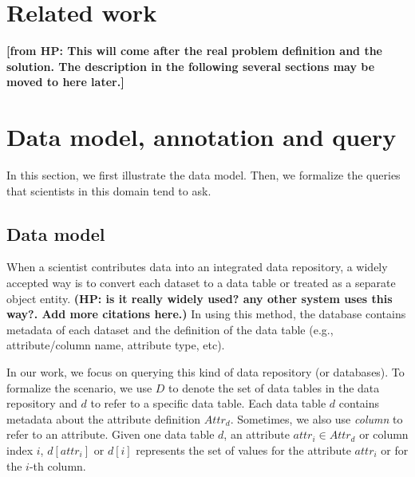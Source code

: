 \documentclass[conference]{IEEEtran}
\newcommand{\from}[2]{{\bf[{\sc from #1:} #2]}}
\begin{document}
\section{Related work}\label{sec:relatedwork}

\from{HP}{This will come after the real problem definition and the
  solution. The description in the following several sections may be
  moved to here later.}

\section{Data model, annotation and query}\label{sec:dataquery}




In this section, we first illustrate the data model. Then, we
formalize the queries that scientists in this domain tend to ask. 

\subsection{Data model}\label{sec:datamodel}

When a scientist contributes data into an integrated data repository,
a widely accepted way is to convert each dataset to a data
table\cite{tdar} or treated as a separate object entity\cite{knb}. 
{\bf (HP: is it really widely used? any other system uses this
  way?. Add more citations here.)}
In using this method, the database contains metadata of each
dataset and the definition of the data table (e.g., attribute/column
name, attribute type, etc). 


In our work, we focus on querying this kind of data repository (or
databases). To formalize the scenario, we use $D$ to denote the set of data
tables in the data repository and $d$ to refer to a specific data
table. Each data table $d$ contains metadata about the attribute
definition $Attr_{d}$. Sometimes, we also use {\em column} to refer to an
attribute. 
Given one data table $d$, an attribute $attr_i \in Attr_{d}$ or column index $i$, 
$d[attr_i]$ or $d[i]$ represents the set of values for the attribute
$attr_i$ or for the $i$-th column.
\end{document}
